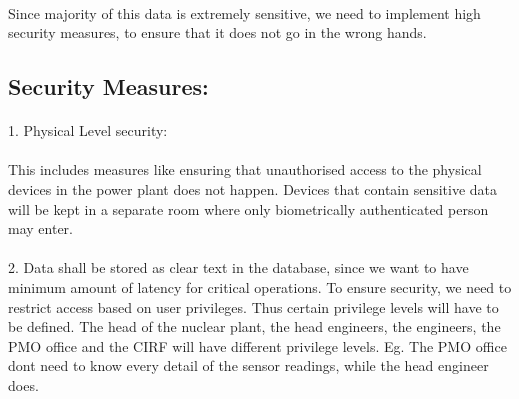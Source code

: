 \documentclass{article}
\begin{document}
\paragraph{}
Since majority of this data is extremely sensitive, we need to implement high security measures, to ensure that it does not go in the wrong hands.
\subsection{Security Measures:}
\paragraph{}
1. Physical Level security:\paragraph{}
This includes measures like ensuring that unauthorised access to the physical devices in the power plant does not happen. 
Devices that contain sensitive data will be kept in a separate room where only biometrically authenticated person may enter.
\paragraph{}
2. Data shall be stored as clear text in the database, since we want to have minimum amount of latency for critical operations. To ensure security, we need to restrict access based on user privileges. Thus certain privilege levels will have to be defined. The head of the nuclear plant, the head engineers, the engineers, the PMO office and the CIRF will have different privilege levels. Eg. The PMO office dont need to know every detail of the sensor readings, while the head engineer does.
\end{document}
